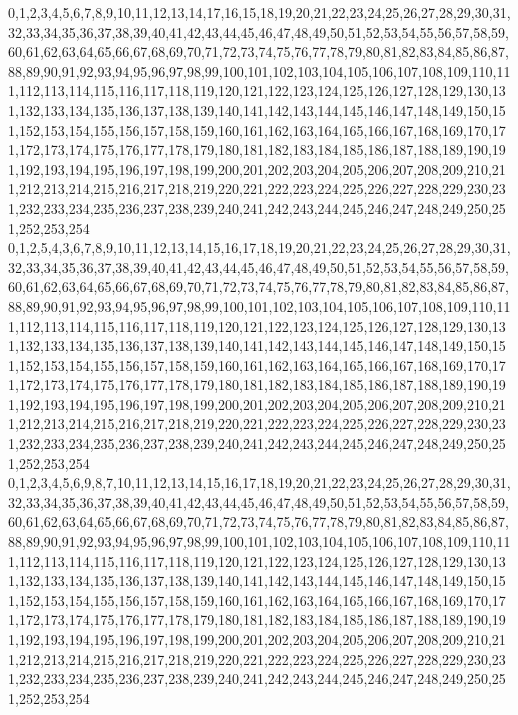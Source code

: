 \documentclass[12pt]{article}
\begin{document}
{0,1,2,3,4,5,6,7,8,9,10,11,12,13,14,17,16,15,18,19,20,21,22,23,24,25,26,27,28,29,30,31,32,33,34,35,36,37,38,39,40,41,42,43,44,45,46,47,48,49,50,51,52,53,54,55,56,57,58,59,60,61,62,63,64,65,66,67,68,69,70,71,72,73,74,75,76,77,78,79,80,81,82,83,84,85,86,87,88,89,90,91,92,93,94,95,96,97,98,99,100,101,102,103,104,105,106,107,108,109,110,111,112,113,114,115,116,117,118,119,120,121,122,123,124,125,126,127,128,129,130,131,132,133,134,135,136,137,138,139,140,141,142,143,144,145,146,147,148,149,150,151,152,153,154,155,156,157,158,159,160,161,162,163,164,165,166,167,168,169,170,171,172,173,174,175,176,177,178,179,180,181,182,183,184,185,186,187,188,189,190,191,192,193,194,195,196,197,198,199,200,201,202,203,204,205,206,207,208,209,210,211,212,213,214,215,216,217,218,219,220,221,222,223,224,225,226,227,228,229,230,231,232,233,234,235,236,237,238,239,240,241,242,243,244,245,246,247,248,249,250,251,252,253,254\\
0,1,2,5,4,3,6,7,8,9,10,11,12,13,14,15,16,17,18,19,20,21,22,23,24,25,26,27,28,29,30,31,32,33,34,35,36,37,38,39,40,41,42,43,44,45,46,47,48,49,50,51,52,53,54,55,56,57,58,59,60,61,62,63,64,65,66,67,68,69,70,71,72,73,74,75,76,77,78,79,80,81,82,83,84,85,86,87,88,89,90,91,92,93,94,95,96,97,98,99,100,101,102,103,104,105,106,107,108,109,110,111,112,113,114,115,116,117,118,119,120,121,122,123,124,125,126,127,128,129,130,131,132,133,134,135,136,137,138,139,140,141,142,143,144,145,146,147,148,149,150,151,152,153,154,155,156,157,158,159,160,161,162,163,164,165,166,167,168,169,170,171,172,173,174,175,176,177,178,179,180,181,182,183,184,185,186,187,188,189,190,191,192,193,194,195,196,197,198,199,200,201,202,203,204,205,206,207,208,209,210,211,212,213,214,215,216,217,218,219,220,221,222,223,224,225,226,227,228,229,230,231,232,233,234,235,236,237,238,239,240,241,242,243,244,245,246,247,248,249,250,251,252,253,254\\
0,1,2,3,4,5,6,9,8,7,10,11,12,13,14,15,16,17,18,19,20,21,22,23,24,25,26,27,28,29,30,31,32,33,34,35,36,37,38,39,40,41,42,43,44,45,46,47,48,49,50,51,52,53,54,55,56,57,58,59,60,61,62,63,64,65,66,67,68,69,70,71,72,73,74,75,76,77,78,79,80,81,82,83,84,85,86,87,88,89,90,91,92,93,94,95,96,97,98,99,100,101,102,103,104,105,106,107,108,109,110,111,112,113,114,115,116,117,118,119,120,121,122,123,124,125,126,127,128,129,130,131,132,133,134,135,136,137,138,139,140,141,142,143,144,145,146,147,148,149,150,151,152,153,154,155,156,157,158,159,160,161,162,163,164,165,166,167,168,169,170,171,172,173,174,175,176,177,178,179,180,181,182,183,184,185,186,187,188,189,190,191,192,193,194,195,196,197,198,199,200,201,202,203,204,205,206,207,208,209,210,211,212,213,214,215,216,217,218,219,220,221,222,223,224,225,226,227,228,229,230,231,232,233,234,235,236,237,238,239,240,241,242,243,244,245,246,247,248,249,250,251,252,253,254\\
}
\end{document}
